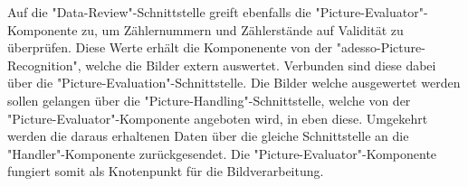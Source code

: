 Auf die "Data-Review"-Schnittstelle greift ebenfalls die "Picture-Evaluator"-Komponente zu, um Zählernummern und Zählerstände auf Validität zu überprüfen. Diese Werte erhält die Komponenente von der "adesso-Picture-Recognition", welche die Bilder extern auswertet. Verbunden sind diese dabei über die "Picture-Evaluation"-Schnittstelle. Die Bilder welche ausgewertet werden sollen gelangen über die "Picture-Handling"-Schnittstelle, welche von der "Picture-Evaluator"-Komponente angeboten wird, in eben diese. Umgekehrt werden die daraus erhaltenen Daten über die gleiche Schnittstelle an die "Handler"-Komponente zurückgesendet. Die "Picture-Evaluator"-Komponente fungiert somit als Knotenpunkt für die Bildverarbeitung. 

